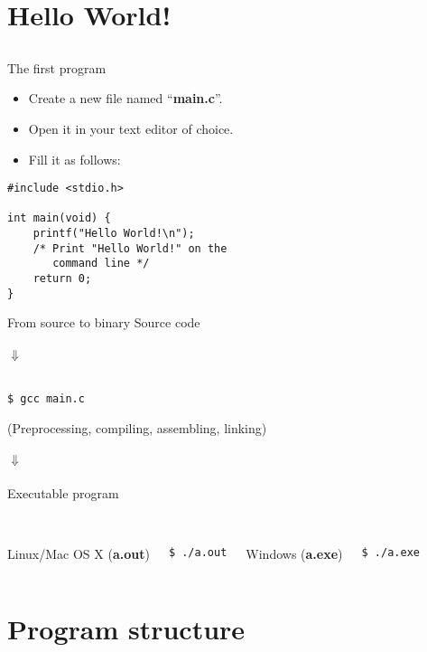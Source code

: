 \section{Hello World!}
\subsection{}
\begin{frame}[fragile]{The first program}
	\begin{itemize}
		\item Create a new file named ``\textbf{main.c}''.
		\item Open it in your text editor of choice.
		\item Fill it as follows:
	\end{itemize}
	\begin{lstlisting}
#include <stdio.h>

int main(void) {
	printf("Hello World!\n");
	/* Print "Hello World!" on the
	   command line */
	return 0;
}
\end{lstlisting}
\end{frame}
\begin{frame}[fragile]{From source to binary}
	\centering
	Source code\\\ \\
	$\Downarrow$\\\ \\
	\begin{lstlisting}[numbers=none]
$ gcc main.c
\end{lstlisting}
(Preprocessing, compiling, assembling, linking)
	\ \\\ \\
	$\Downarrow$\\\ \\
	Executable program\\\ \\
	\begin{columns}[T]
		Linux/Mac OS X (\textbf{a.out})
		\begin{lstlisting}[numbers=none]
$ ./a.out
\end{lstlisting}
		Windows (\textbf{a.exe})
		\begin{lstlisting}[numbers=none]
$ ./a.exe
\end{lstlisting}
	\end{columns}
\end{frame}
\section{Program structure}
